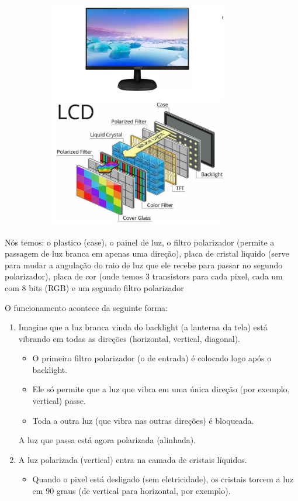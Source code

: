\documentclass[12pt,a4paper]{report}
\begin{document}
	\begin{center}
		
		\includegraphics[width=12cm,height=10cm,keepaspectratio=false]{imagens-teoria/monitor.png}
		
	\end{center}
	
	Nós temos: o plastico (case), o painel de luz, o filtro polarizador (permite a passagem de luz branca em apenas uma direção), placa de cristal liquido (serve para mudar a angulação do raio de luz que ele recebe para passar no segundo polarizador), placa de cor (onde temos 3 transistors para cada pixel, cada um com 8 bits (RGB) e um segundo filtro polarizador
	
	O funcionamento acontece da seguinte forma: 
	
	\begin{enumerate}
		\item Imagine que a luz branca vinda do backlight (a lanterna da tela) está vibrando em todas as direções (horizontal, vertical, diagonal).
		\begin{itemize}
			\item O primeiro filtro polarizador (o de entrada) é colocado logo após o backlight.
			\item Ele só permite que a luz que vibra em uma única direção (por exemplo, vertical) passe.
			\item Toda a outra luz (que vibra nas outras direções) é bloqueada.
		\end{itemize}
		A luz que passa está agora polarizada (alinhada).
		
		\item A luz polarizada (vertical) entra na camada de cristais líquidos.
		\begin{itemize}
			\item Quando o pixel está desligado (sem eletricidade), os cristais torcem a luz em 90 graus (de vertical para horizontal, por exemplo).
		\end{itemize}
		
		
		
	\end{enumerate}
	
\end{document}
